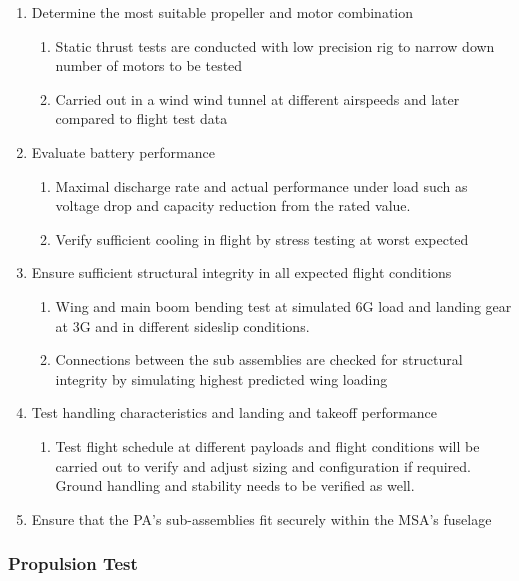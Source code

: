 \begin{enumerate}
\item Determine the most suitable propeller and motor combination
        \begin{enumerate}
            \item Static thrust tests are conducted with low precision rig to narrow down number of motors to be tested
            \item Carried out in a wind wind tunnel at different airspeeds and later compared to flight test data
        \end{enumerate}
\item Evaluate battery performance
        \begin{enumerate}
            \item Maximal discharge rate and actual performance under load such as voltage drop and capacity reduction from the rated value. 
            \item Verify sufficient cooling in flight by stress testing at worst expected
        \end{enumerate}
\item Ensure sufficient structural integrity in all expected flight conditions
        \begin{enumerate}
            \item Wing and main boom bending test at simulated 6G load and landing gear at 3G and in different sideslip conditions.
            \item Connections between the sub assemblies are checked for structural integrity by simulating highest predicted wing loading
        \end{enumerate}
\item Test handling characteristics and landing and takeoff performance
        \begin{enumerate}
            \item Test flight schedule at different payloads and flight conditions will be carried out to verify and adjust sizing and configuration if required. Ground handling and stability needs to be verified as well.
        \end{enumerate}
\item Ensure that the PA's sub-assemblies fit securely within the MSA's fuselage
\end{enumerate}

\subsubsection{Propulsion Test}
%
